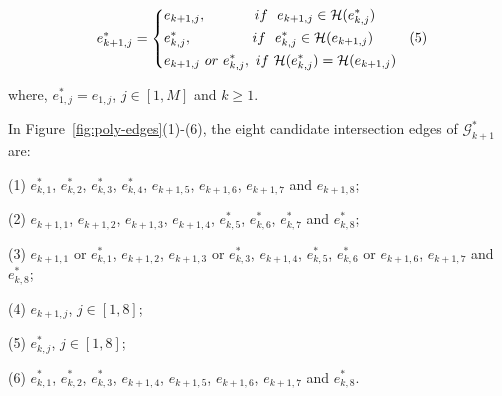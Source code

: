 \vspace{-2ex}
\begin{equation*}
\label{equ-inter-edge}
    \begin{aligned}
        \hspace{1ex}  e^*_{k+1, j} = \left\{
            \begin{aligned}
                & e_{k+1, j},   \hspace{8ex}if~~ e_{k+1,j} \in \mathcal{H}(e^*_{k,j}) \\
                & e^*_{k, j},   \hspace{10ex}if~~ e^*_{k,j} \in \mathcal{H}(e_{k+1,j})      \hspace{6ex} (5)  \\
                & e_{k+1, j} ~or~ e^*_{k, j}, ~if~ \mathcal{H}(e^*_{k,j}) = \mathcal{H}(e_{k+1,j}) \\
            \end{aligned}
        \right.
    \end{aligned}
\end{equation*}
\vspace{-1ex}

where,  $e^*_{1, j} = e_{1, j}$, $j \in [1, M]$ and $k\ge 1$.



\begin{example}
In Figure~\ref{fig:poly-edges}(1)-(6), the eight candidate intersection edges of $\mathcal{G}^*_{k+1}$ are:

(1) $e^*_{k,1}$, $e^*_{k,2}$, $e^*_{k,3}$, $e^*_{k,4}$, $e_{k+1,5}$, $e_{k+1,6}$, $e_{k+1,7}$ and $e_{k+1,8}$;

(2) $e_{k+1,1}$, $e_{k+1,2}$, $e_{k+1,3}$, $e_{k+1,4}$, $e^*_{k,5}$, $e^*_{k,6}$, $e^*_{k,7}$ and $e^*_{k,8}$;

(3) $e_{k+1,1}$ or $e^*_{k,1}$, $e_{k+1,2}$, $e_{k+1,3}$ or $e^*_{k,3}$, $e_{k+1,4}$, $e^*_{k,5}$, $e^*_{k,6}$ or $e_{k+1,6}$, $e_{k+1,7}$ and $e^*_{k,8}$;

(4) $e_{k+1,j}$, $j \in [1, 8]$;

(5) $e^*_{k,j}$, $j \in [1, 8]$;

(6) $e^*_{k,1}$, $e^*_{k,2}$, $e^*_{k,3}$, $e_{k+1,4}$, $e_{k+1,5}$, $e_{k+1,6}$, $e_{k+1,7}$ and $e^*_{k,8}$.


\end{example}





